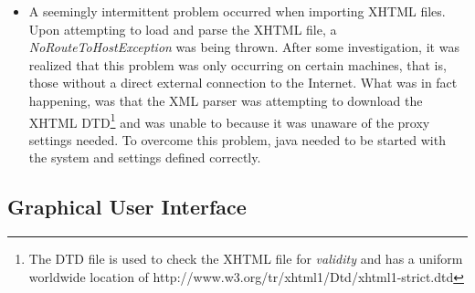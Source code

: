 \begin{itemize}
\item A seemingly intermittent problem occurred when importing XHTML files.
Upon attempting to load and parse the XHTML file, a
\emph{NoRouteToHostException} was being thrown. After some investigation, it
was realized that this problem was only occurring on certain machines, that is,
those without a direct external connection to the Internet. What was in fact
happening, was that the XML parser was attempting to download the XHTML
DTD\footnote{The DTD file is used to check the XHTML file for \emph{validity}
and has a uniform worldwide location of
http://www.w3.org/tr/xhtml1/Dtd/xhtml1-strict.dtd} and was unable to because it
was unaware of the proxy settings needed. To overcome this problem, java
needed to be started with the system  and 
settings defined correctly.

\end{itemize}

\subsection{Graphical User Interface}

